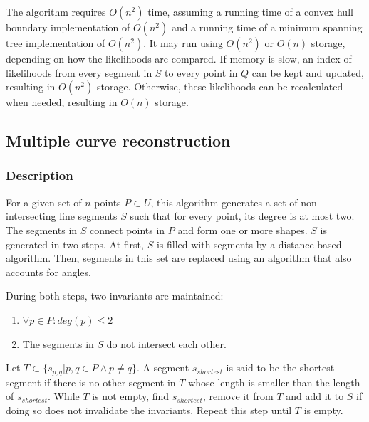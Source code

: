 \documentclass[11pt]{article}
\begin{document}
The algorithm requires $O(n^2)$ time, assuming a running time of a convex hull boundary implementation of $O(n^2)$ and a running time of a minimum spanning tree implementation of $O(n^2)$. It may run using $O(n^2)$ or $O(n)$ storage, depending on how the likelihoods are compared. If memory is slow, an index of likelihoods from every segment in $S$ to every point in $Q$ can be kept and updated, resulting in $O(n^2)$ storage. Otherwise, these likelihoods can be recalculated when needed, resulting in $O(n)$ storage.

\subsection{Multiple curve reconstruction}
\subsubsection{Description}
For a given set of $n$ points $P \subset U$, this algorithm generates a set of non-intersecting line segments $S$ such that for every point, its degree is at most two.
The segments in $S$ connect points in $P$ and form one or more shapes.
$S$ is generated in two steps. At first, $S$ is filled with segments by a distance-based algorithm. Then, segments in this set are replaced using an algorithm that also accounts for angles.

During both steps, two invariants are maintained:%
\noindent\begin{enumerate}\topsep=0pt\itemsep=0pt\parsep=0pt
\item $\forall p \in P : deg(p) \leq 2$
\item The segments in $S$ do not intersect each other.
\end{enumerate}


Let $T \subset \{s_{p,q} | p,q \in P \land p \neq q \}$. A segment $s_{shortest}$ is said to be the shortest segment if there is no other segment in $T$ whose length is smaller than the length of $s_{shortest}$.
While $T$ is not empty, find $s_{shortest}$, remove it from $T$ and add it to $S$ if doing so does not invalidate the invariants. Repeat this step until $T$ is empty.
\end{document}
